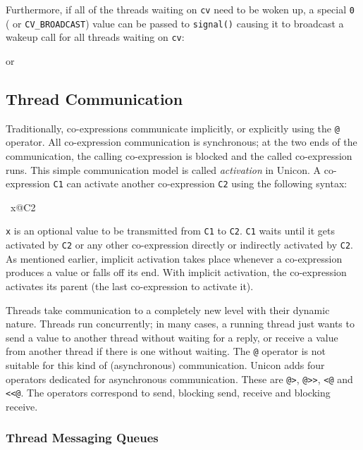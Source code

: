 
Furthermore, if all of the threads waiting on
\texttt{cv} need to be woken up, a special
\texttt{0} ( or \texttt{CV\_BROADCAST})
value can be passed to \texttt{signal()} causing it to
broadcast a wakeup call for all threads waiting on
\texttt{cv}:


or



\subsection{Thread Communication}


Traditionally, co-expressions communicate implicitly, or explicitly
using the \texttt{@} operator. All co-expression
communication is synchronous; at the two ends of the communication, the
calling co-expression is blocked and the called co-expression runs.
This simple communication model is called \textit{activation} in
Unicon. A co-expression \texttt{C1} can activate another
co-expression \texttt{C2} using the following syntax:

\ x@C2

\texttt{x} is an optional value to be transmitted from
\texttt{C1} to \texttt{C2}.
\texttt{C1} waits until it gets activated by
\texttt{C2} or any other co-expression directly or
indirectly activated by \texttt{C2}. As mentioned earlier,
implicit activation takes place whenever a co-expression produces a
value or falls off its end. With implicit activation, the co-expression
activates its parent (the last co-expression to activate it).

Threads take communication to a completely new level with their dynamic
nature. Threads run concurrently; in many cases, a running thread just
wants to send a value to another thread without waiting for a reply, or
receive a value from another thread if there is one without waiting.
The \texttt{@} operator is not suitable for this kind of
(asynchronous) communication. Unicon adds four operators dedicated for
asynchronous communication. These are
\texttt{@{\textgreater}},
\texttt{@{\textgreater}{\textgreater}},
\texttt{{\textless}@} and
\texttt{{\textless}{\textless}@}. The operators correspond
to send, blocking send, receive and blocking receive.

\subsubsection{Thread Messaging Queues}

